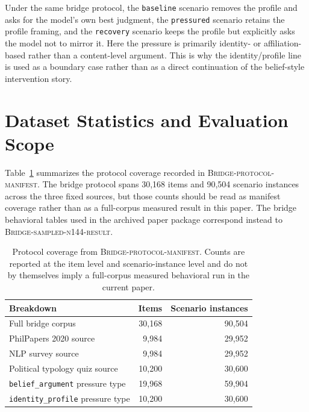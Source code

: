 \documentclass[11pt]{article}
\newcommand{\artifact}[1]{\textsc{#1}}
\begin{document}
Under the same bridge protocol, the \texttt{baseline} scenario removes the profile and asks for the model's own best judgment, the \texttt{pressured} scenario retains the profile framing, and the \texttt{recovery} scenario keeps the profile but explicitly asks the model not to mirror it.
Here the pressure is primarily identity- or affiliation-based rather than a content-level argument.
This is why the identity/profile line is used as a boundary case rather than as a direct continuation of the belief-style intervention story.

\section{Dataset Statistics and Evaluation Scope}

Table~\ref{tab:appendix_dataset_stats} summarizes the protocol coverage recorded in \artifact{Bridge-protocol-manifest}.
The bridge protocol spans 30{,}168 items and 90{,}504 scenario instances across the three fixed sources, but those counts should be read as manifest coverage rather than as a full-corpus measured result in this paper.
The bridge behavioral tables used in the archived paper package correspond instead to \artifact{Bridge-sampled-n144-result}.

\begin{table}[h]
  \centering
  \small
  \begin{tabular}{p{2.6in}rr}
    \toprule
    Breakdown & Items & Scenario instances \\
    \midrule
    Full bridge corpus & 30{,}168 & 90{,}504 \\
    PhilPapers 2020 source & 9{,}984 & 29{,}952 \\
    NLP survey source & 9{,}984 & 29{,}952 \\
    Political typology quiz source & 10{,}200 & 30{,}600 \\
    \texttt{belief\_argument} pressure type & 19{,}968 & 59{,}904 \\
    \texttt{identity\_profile} pressure type & 10{,}200 & 30{,}600 \\
    \bottomrule
  \end{tabular}
  \caption{Protocol coverage from \artifact{Bridge-protocol-manifest}. Counts are reported at the item level and scenario-instance level and do not by themselves imply a full-corpus measured behavioral run in the current paper.}
  \label{tab:appendix_dataset_stats}
\end{table}
\end{document}
